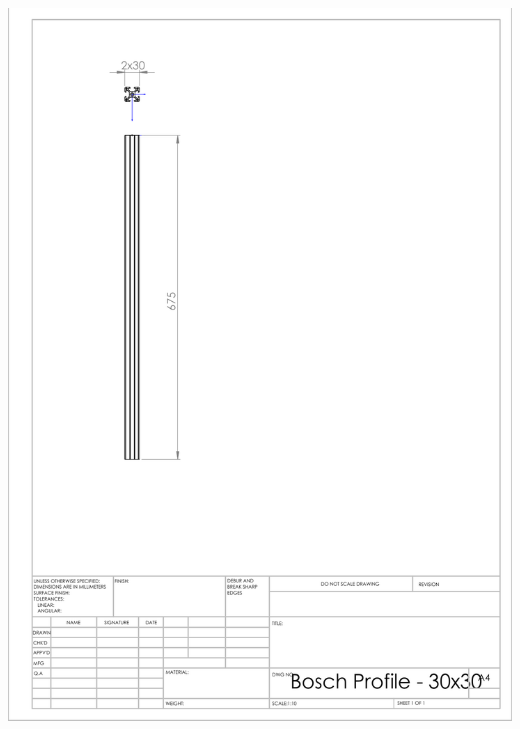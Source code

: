 \begin{appendices}
        \includegraphics[width=\linewidth]{chapters/cha_appendices/bosch_profile}


\end{appendices}
